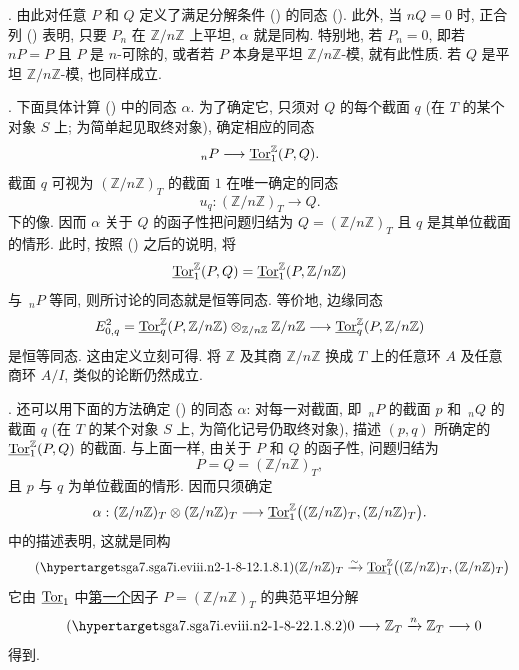 . 由此对任意 $P$ 和 $Q$ 定义了满足分解条件 () 的同态 (). 此外, 当 $nQ=0$ 时, 正合列 () 表明, 只要 $P_n$ 在 $\mathbb Z/n\mathbb Z$ 上平坦, $\alpha$ 就是同构. 特别地, 若 $P_n=0$, 即若 $nP=P$ 且 $P$ 是 $n$-可除的, 或者若 $P$ 本身是平坦 $\mathbb Z/n\mathbb Z$-模, 就有此性质. 若 $Q$ 是平坦 $\mathbb Z/n\mathbb Z$-模, 也同样成立.

. 下面具体计算 () 中的同态 $\alpha$. 为了确定它, 只须对 $Q$ 的每个截面 $q$ (在 $T$ 的某个对象 $S$ 上; 为简单起见取终对象), 确定相应的同态
\[
 {}_nP\longrightarrow\uTor^{\mathbb Z}_1(P,Q).
\]
截面 $q$ 可视为 $(\mathbb Z/n\mathbb Z)_T$ 的截面 $1$ 在唯一确定的同态
\[
 u_q:(\mathbb Z/n\mathbb Z)_T\longrightarrow Q.
\]
下的像. 因而 $\alpha$ 关于 $Q$ 的函子性把问题归结为 $Q=(\mathbb Z/n\mathbb Z)_T$ 且 $q$ 是其单位截面的情形. 此时, 按照 () 之后的说明, 将
\[
 \uTor^{\mathbb Z}_1(P,Q)
 =
 \uTor^{\mathbb Z}_1(P,\mathbb Z/n\mathbb Z)
\]
与 $\,{}_nP$ 等同, 则所讨论的同态就是恒等同态. 等价地, 边缘同态
\[
 E^2_{0,q}
 =
 \uTor^{\mathbb Z}_q(P,\mathbb Z/n\mathbb Z)
 \otimes_{\mathbb Z/n\mathbb Z}\mathbb Z/n\mathbb Z
 \longrightarrow
 \uTor^{\mathbb Z}_q(P,\mathbb Z/n\mathbb Z)
\]
是恒等同态. 这由定义立刻可得. 将 $\mathbb Z$ 及其商 $\mathbb Z/n\mathbb Z$ 换成 $T$ 上的任意环 $A$ 及任意商环 $A/I$, 类似的论断仍然成立.

. 还可以用下面的方法确定 () 的同态 $\alpha$: 对每一对截面, 即 $\,{}_nP$ 的截面 $p$ 和 $\,{}_nQ$ 的截面 $q$ (在 $T$ 的某个对象 $S$ 上, 为简化记号仍取终对象), 描述 $(p,q)$ 所确定的 $\uTor^{\mathbb Z}_1(P,Q)$ 的截面. 与上面一样, 由关于 $P$ 和 $Q$ 的函子性, 问题归结为
\[
 P=Q=(\mathbb Z/n\mathbb Z)_T,
\]
且 $p$ 与 $q$ 为单位截面的情形. 因而只须确定
\[
 \alpha:
 (\mathbb Z/n\mathbb Z)_T\otimes(\mathbb Z/n\mathbb Z)_T
 \longrightarrow
 \uTor^{\mathbb Z}_1
 \bigl((\mathbb Z/n\mathbb Z)_T,(\mathbb Z/n\mathbb Z)_T\bigr).
\]
 中的描述表明, 这就是同构
\begin{equation}\tag{\SGARefTarget{sga7.sga7i.eviii.n2-1-8-1}{2.1.8.1}}
 (\mathbb Z/n\mathbb Z)_T
 \xrightarrow{\sim}
 \uTor^{\mathbb Z}_1
 \bigl((\mathbb Z/n\mathbb Z)_T,(\mathbb Z/n\mathbb Z)_T\bigr)
\end{equation}
它由 $\uTor_1$ 中\underline{第一个}因子 $P=(\mathbb Z/n\mathbb Z)_T$ 的典范平坦分解
\begin{equation}\tag{\SGARefTarget{sga7.sga7i.eviii.n2-1-8-2}{2.1.8.2}}
 0\longrightarrow\mathbb Z_T
 \xrightarrow{n}\mathbb Z_T
 \longrightarrow0
\end{equation}
得到.

